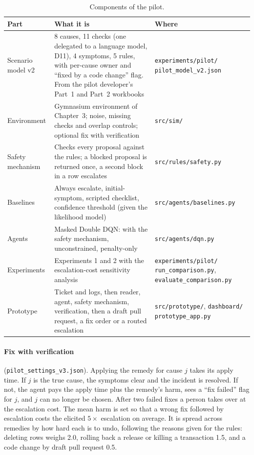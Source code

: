 \documentclass[11pt,a4paper]{article}
\newcommand{\file}[1]{\texttt{\small #1}}
\begin{document}
\begin{table}[H]
\centering\small
\caption{Components of the pilot.}
\begin{tabularx}{\linewidth}{@{}p{2.6cm}Lp{4.2cm}@{}}
\toprule
Part & What it is & Where \\
\midrule
Scenario model v2 & 8 causes, 11 checks (one delegated to a language model, D11), 4 symptoms, 5 rules, with per-cause owner and ``fixed by a code change'' flag. From the pilot developer's Part~1 and Part~2 workbooks & \file{experiments/pilot/ pilot\_model\_v2.json} \\
Environment & Gymnasium environment of Chapter~3; noise, missing checks and overlap controls; optional fix with verification & \file{src/sim/} \\
Safety mechanism & Checks every proposal against the rules; a blocked proposal is returned once, a second block in a row escalates & \file{src/rules/safety.py} \\
Baselines & Always escalate, initial-symptom, scripted checklist, confidence threshold (given the likelihood model) & \file{src/agents/baselines.py} \\
Agents & Masked Double DQN: with the safety mechanism, unconstrained, penalty-only & \file{src/agents/dqn.py} \\
Experiments & Experiments 1 and 2 with the escalation-cost sensitivity analysis & \file{experiments/pilot/ run\_comparison.py}, \file{evaluate\_comparison.py} \\
Prototype & Ticket and logs, then reader, agent, safety mechanism, verification, then a draft pull request, a fix order or a routed escalation & \file{src/prototype/}, \file{dashboard/ prototype\_app.py} \\
\bottomrule
\end{tabularx}
\end{table}

\paragraph{Fix with verification} (\file{pilot\_settings\_v3.json}). Applying the remedy for cause $j$ takes its apply time. If $j$ is the true cause, the symptoms clear and the incident is resolved. If not, the agent pays the apply time plus the remedy's harm, sees a ``fix failed'' flag for $j$, and $j$ can no longer be chosen. After two failed fixes a person takes over at the escalation cost. The mean harm is set so that a wrong fix followed by escalation costs the elicited $5\times$ escalation on average. It is spread across remedies by how hard each is to undo, following the reasons given for the rules: deleting rows weighs 2.0, rolling back a release or killing a transaction 1.5, and a code change by draft pull request 0.5.
\end{document}
